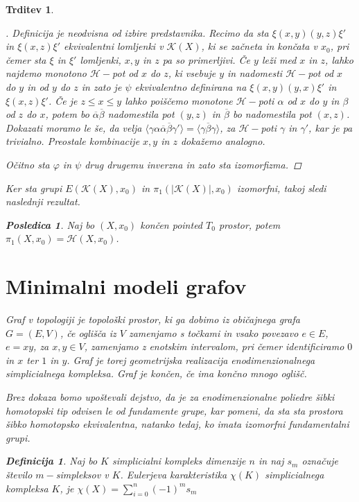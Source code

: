 \documentclass[a4paper,12pt]{article}
\DeclareRobustCommand{\k}{
    \mathcal{K}
}
\DeclareRobustCommand{\h}{
    \mathcal{H}
}
\DeclareRobustCommand{\pot}{
    $\h-$pot
}
\theoremstyle{definition}
\newtheorem{definicija}{Definicija}
\theoremstyle{plain}
\theoremstyle{definition}
\theoremstyle{plain}
\newtheorem{trditev}{Trditev}
\theoremstyle{plain}
\newtheorem{posledica}{Posledica}
\theoremstyle{plain}
\theoremstyle{plain}
\newenvironment{dokaz}{\begin{proof}[\bfseries\upshape\proofname]}{\end{proof}}
\begin{document}
\begin{trditev}
\begin{dokaz}
Definicija je neodvisna od izbire predstavnika. Recimo da sta $\xi(x,y)(y,z)\xi'$ in $\xi(x,z)\xi'$ ekvivalentni lomljenki v $\k(X)$, ki se začneta in končata v $x_0$, pri čemer sta $\xi$ in $\xi'$ lomljenki, $x,y$ in $z$ pa so primerljivi.
Če $y$ leži med $x$ in $z$, lahko najdemo monotono $\mathcal{H}-$pot od $x$ do $z$, ki vsebuje $y$ in nadomesti \pot od $x$ do $y$ in od $y$ do $z$ in zato je $\psi$ ekvivalentno definirana na $\xi(x,y)(y,x)\xi'$ in $\xi(x,z)\xi'$.
Če je $z\leq x \leq y$ lahko poiščemo monotone $\mathcal{H}-$poti $\alpha$ od $x$ do $y$ in $\beta$ od $z$ do $x$, potem bo $\overline{\alpha}\overline{\beta}$ nadomestila pot $(y,z)$ in $\overline{\beta}$ bo nadomestila pot $(x,z)$. Dokazati moramo le še, da velja $\langle\gamma \alpha \overline{\alpha}\overline{\beta}\gamma'\rangle=\langle \gamma\overline{\beta}\gamma\rangle$, za $\h-$poti $\gamma$ in $\gamma'$, kar je pa trivialno. Preostale kombinacije $x,y$ in $z$ dokažemo analogno.

Očitno sta $\varphi$ in $\psi$ drug drugemu inverzna in zato sta izomorfizma.
\end{dokaz}

Ker sta grupi $E(\k(X),x_0)$ in $\pi_1(|\k(X)|,x_0)$ izomorfni, takoj sledi naslednji rezultat.

\begin{posledica}
    Naj bo $(X,x_0)$ končen pointed $T_0$ prostor, potem $\pi_1(X,x_0)=\mathscr{H}(X,x_0)$.
\end{posledica}
\section{Minimalni modeli grafov}

Graf v topologiji je topološki prostor, ki ga dobimo iz običajnega grafa 
$G=(E,V)$, če oglišča iz $V$ zamenjamo s točkami in vsako povezavo $e\in 
E$, $e=xy$, za $x,y\in V$, zamenjamo z enotskim intervalom, pri čemer 
identificiramo $0$ in $x$ ter $1$ in $y$.
Graf je torej geometrijska realizacija enodimenzionalnega simplicialnega 
kompleksa. Graf je končen, če ima končno mnogo oglišč. 

Brez dokaza bomo upoštevali dejstvo, da je za enodimenzionalne poliedre 
šibki homotopski tip odvisen le od fundamente grupe, kar pomeni, da sta 
sta prostora šibko homotopsko ekvivalentna, natanko tedaj, ko imata 
izomorfni fundamentalni grupi.


\begin{definicija}
    Naj bo $K$ simplicialni kompleks dimenzije $n$ in naj $s_m$ označuje število $m-$simpleksov v $K$.
    \textit{Eulerjeva karakteristika} $\chi(K)$ simplicialnega kompleksa $K$, je  $\chi(X)=\sum\limits_{i=0}^n (-1)^m s_m$
\end{definicija}


\end{trditev}
\end{document}
